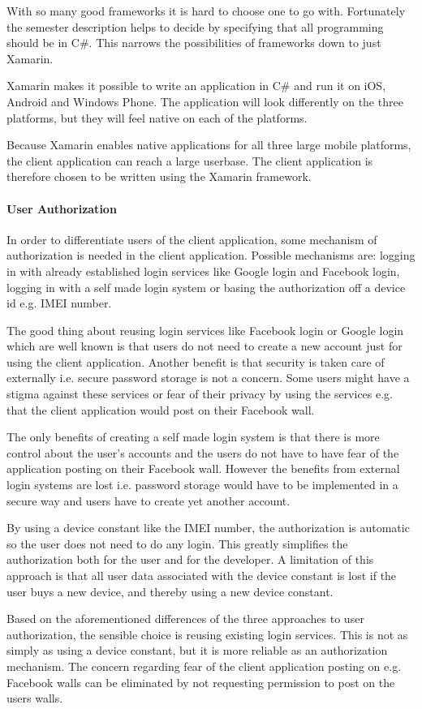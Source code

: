 With so many good frameworks it is hard to choose one to go with. Fortunately the semester description helps to decide by specifying that all programming should be in C\#. This narrows the possibilities of frameworks down to just Xamarin.

Xamarin makes it possible to write an application in C\# and run it on iOS, Android and Windows Phone. The application will look differently on the three platforms, but they will feel native on each of the platforms.

Because Xamarin enables native applications for all three large mobile platforms, the client application can reach a large userbase. The client application is therefore chosen to be written using the Xamarin framework.

\paragraph{User Authorization}
\label{par:user_authorization}

In order to differentiate users of the client application, some mechanism of authorization is needed in the client application. Possible mechanisms are: logging in with already established login services like Google login and Facebook login, logging in with a self made login system or basing the authorization off a device id e.g. IMEI number.

The good thing about reusing login services like Facebook login or Google login which are well known is that users do not need to create a new account just for using the client application. Another benefit is that security is taken care of externally i.e. secure password storage is not a concern. Some users might have a stigma against these services or fear of their privacy by using the services e.g. that the client application would post on their Facebook wall.

The only benefits of creating a self made login system is that there is more control about the user's accounts and the users do not have to have fear of the application posting on their Facebook wall. However the benefits from external login systems are lost i.e. password storage would have to be implemented in a secure way and users have to create yet another account.

By using a device constant like the IMEI number, the authorization is automatic so the user does not need to do any login. This greatly simplifies the authorization both for the user and for the developer. A limitation of this approach is that all user data associated with the device constant is lost if the user buys a new device, and thereby using a new device constant.

Based on the aforementioned differences of the three approaches to user authorization, the sensible choice is reusing existing login services. This is not as simply as using a device constant, but it is more reliable as an authorization mechanism. The concern regarding fear of the client application posting on e.g. Facebook walls can be eliminated by not requesting permission to post on the users walls.
